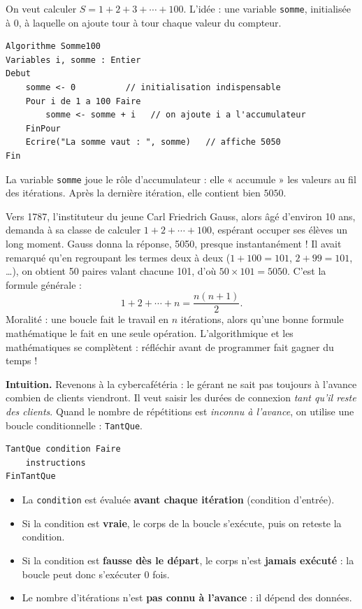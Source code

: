 \documentclass[11pt]{article}
\newcommand{\cle}[1]{{\popxbold\color{popdark}#1}}
\newcounter{popsec}
\newcounter{popsub}
\newcommand{\courssub}[1]{%
  \stepcounter{popsub}%
  \par\vspace{9pt}\noindent{\popxbold\fontsize{11.5}{13}\selectfont\color{popink}{\color{poporange}\thepopsec.\thepopsub}\hspace{6pt}#1}\par\nopagebreak\vspace{4pt}
}
\begin{document}
\begin{exemplebox}
On veut calculer $S = 1 + 2 + 3 + \cdots + 100$. L'idée : une variable \texttt{somme}, initialisée à 0, à laquelle on ajoute tour à tour chaque valeur du compteur.
\begin{lstlisting}
Algorithme Somme100
Variables i, somme : Entier
Debut
    somme <- 0          // initialisation indispensable
    Pour i de 1 a 100 Faire
        somme <- somme + i   // on ajoute i a l'accumulateur
    FinPour
    Ecrire("La somme vaut : ", somme)   // affiche 5050
Fin
\end{lstlisting}
La variable \texttt{somme} joue le rôle d'\cle{accumulateur} : elle « accumule » les valeurs au fil des itérations. Après la dernière itération, elle contient bien $5050$.
\end{exemplebox}

\begin{savaistu}
Vers 1787, l'instituteur du jeune Carl Friedrich Gauss, alors âgé d'environ 10 ans, demanda à sa classe de calculer $1 + 2 + \cdots + 100$, espérant occuper ses élèves un long moment. Gauss donna la réponse, 5050, presque instantanément ! Il avait remarqué qu'en regroupant les termes deux à deux ($1 + 100 = 101$, $2 + 99 = 101$, \dots), on obtient 50 paires valant chacune 101, d'où $50 \times 101 = 5050$. C'est la formule générale :
\[ 1 + 2 + \cdots + n = \frac{n(n+1)}{2}. \]
Moralité : une boucle fait le travail en $n$ itérations, alors qu'une bonne formule mathématique le fait en une seule opération. L'algorithmique et les mathématiques se complètent : réfléchir avant de programmer fait gagner du temps !
\end{savaistu}

\courssub{La boucle TantQue ... Faire}

\textbf{Intuition.} Revenons à la cybercafétéria : le gérant ne sait pas toujours à l'avance combien de clients viendront. Il veut saisir les durées de connexion \emph{tant qu'il reste des clients}. Quand le nombre de répétitions est \emph{inconnu à l'avance}, on utilise une boucle conditionnelle : \texttt{TantQue}.

\begin{propriete}
\begin{lstlisting}
TantQue condition Faire
    instructions
FinTantQue
\end{lstlisting}
\begin{itemize}
\item La \texttt{condition} est évaluée \textbf{avant chaque itération} (condition d'entrée).
\item Si la condition est \textbf{vraie}, le corps de la boucle s'exécute, puis on reteste la condition.
\item Si la condition est \textbf{fausse dès le départ}, le corps n'est \textbf{jamais exécuté} : la boucle peut donc s'exécuter 0 fois.
\item Le nombre d'itérations n'est \textbf{pas connu à l'avance} : il dépend des données.
\end{itemize}
\end{propriete}
\end{document}
